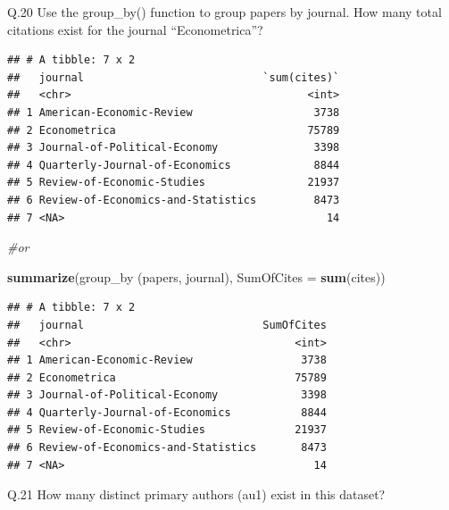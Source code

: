 \documentclass[]{book}
\newenvironment{Shaded}{\begin{snugshade}}{\end{snugshade}}
\newcommand{\KeywordTok}[1]{\textcolor[rgb]{0.13,0.29,0.53}{\textbf{#1}}}
\newcommand{\DataTypeTok}[1]{\textcolor[rgb]{0.13,0.29,0.53}{#1}}
\newcommand{\StringTok}[1]{\textcolor[rgb]{0.31,0.60,0.02}{#1}}
\newcommand{\CommentTok}[1]{\textcolor[rgb]{0.56,0.35,0.01}{\textit{#1}}}
\newcommand{\OperatorTok}[1]{\textcolor[rgb]{0.81,0.36,0.00}{\textbf{#1}}}
\newcommand{\NormalTok}[1]{#1}
\theoremstyle{definition}
\theoremstyle{definition}
\theoremstyle{definition}
\theoremstyle{remark}
\begin{document}
Q.20 Use the group\_by() function to group papers by journal. How many
total citations exist for the journal ``Econometrica''?

\begin{Shaded}
\end{Shaded}

\begin{verbatim}
## # A tibble: 7 x 2
##   journal                            `sum(cites)`
##   <chr>                                     <int>
## 1 American-Economic-Review                   3738
## 2 Econometrica                              75789
## 3 Journal-of-Political-Economy               3398
## 4 Quarterly-Journal-of-Economics             8844
## 5 Review-of-Economic-Studies                21937
## 6 Review-of-Economics-and-Statistics         8473
## 7 <NA>                                         14
\end{verbatim}

\begin{Shaded}
\begin{Highlighting}[]
\CommentTok{#or}

\KeywordTok{summarize}\NormalTok{(group_by}
\NormalTok{          (papers, journal), }
          \DataTypeTok{SumOfCites =} \KeywordTok{sum}\NormalTok{(cites))}
\end{Highlighting}
\end{Shaded}

\begin{verbatim}
## # A tibble: 7 x 2
##   journal                            SumOfCites
##   <chr>                                   <int>
## 1 American-Economic-Review                 3738
## 2 Econometrica                            75789
## 3 Journal-of-Political-Economy             3398
## 4 Quarterly-Journal-of-Economics           8844
## 5 Review-of-Economic-Studies              21937
## 6 Review-of-Economics-and-Statistics       8473
## 7 <NA>                                       14
\end{verbatim}

Q.21 How many distinct primary authors (au1) exist in this dataset?

\begin{Shaded}
\end{Shaded}
\end{document}
